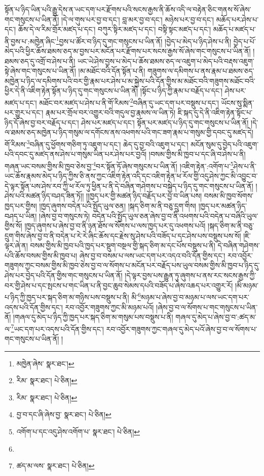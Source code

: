 སྟོན་པ་ཉིད་ཡིན་པའི་རྒྱུ་དེས་ན་ཡང་དག་པར་རྫོགས་པའི་སངས་རྒྱས་ནི་ཆོས་འདི་ལ་བརྟེན་ཅིང་གནས་སོ་ཞེས་གང་གསུངས་པ་ཡིན་ནོ། །དེ་ལ་གུས་པར་བྱ་བ་དང་། བླ་མར་བྱ་བ་དང་། མཉེས་པར་བྱ་བ་དང་། མཆོད་པར་ཤེས་པ་དང་། ཆོས་དེ་ལ་རིམ་གྲོར་མཛད་པ་དང་། བཀུར་སྟིར་མཛད་པ་དང་། བསྟི་སྟང་མཛད་པ་དང་། མཆོད་པ་མཛད་པ་ནི་བྱས་པ་:མཁྱེན་ཞིང་\footnote{མཁྱེན་ཞེས་  སྣར་ཐང་། }བྱས་པ་ཚོར་བ་ཉིད་དུ་གང་གསུངས་པ་ཡིན་ནོ། །བྱེད་པ་མེད་པ་ཉིད་ཤེས་པ་ནི། བྱེད་པ་པོ་མེད་པའི་ཕྱིར་ཆོས་ཐམས་ཅད་མ་བྱས་པར་མངོན་པར་རྫོགས་པར་སངས་རྒྱས་སོ་ཞེས་གང་གསུངས་པ་ཡིན་ནོ། །ཐམས་ཅད་དུ་འགྲོ་བ་ཤེས་པ་ནི། ཡང་ཡེ་ཤེས་བྱས་པ་མེད་པ་ཆོས་ཐམས་ཅད་ལ་འཇུག་པ་མེད་པའི་བརྡས་འཇུག་སྟེ་ཞེས་གང་གསུངས་པ་ཡིན་ནོ། །མ་མཐོང་བའི་དོན་སྟོན་པ་ནི། གཟུགས་ལ་དམིགས་པ་ནས་རྣམ་པ་ཐམས་ཅད་མཁྱེན་པ་ཉིད་ལ་དམིགས་པའི་བར་གྱི་རྣམ་པར་ཤེས་པ་མ་སྐྱེས་པའི་དོན་གྱིས་མ་མཐོང་བའི་གཟུགས་མཐོང་བའི་ཕྱིར་དེ་ནི་འཇིག་རྟེན་སྟོན་པ་ཉིད་དུ་གང་གསུངས་པ་ཡིན་ནོ། །སྟོང་པ་ཉིད་ཀྱི་རྣམ་པ་བརྗོད་པ་དང་། ཤེས་པར་མཛད་པ་དང་། མཐོང་བར་མཛད་པ་ཤེས་པ་ནི་གོ་རིམས་\footnote{རིམ་  སྣར་ཐང་།  པེ་ཅིན། }བཞིན་དུ་ཡང་དག་པར་བསྡུས་པ་དང་། ཡོངས་སུ་སྨིན་པར་གྱུར་པ་དང་། རྣམ་པར་གྲོལ་བར་འགྱུར་བའི་གདུལ་བྱ་རྣམས་ལ་ཡིན་ཏེ། ཇི་སྐད་དུ་དེ་ནི་འཇིག་རྟེན་སྟོང་པ་ཉིད་དོ་ཞེས་བྱ་བར་བརྗོད་པ་དང་། ཤེས་པར་མཛད་པ་དང་། སྟོན་པར་མཛད་པ་ཉིད་དུ་གང་གསུངས་པ་ཡིན་ནོ། །དེ་ལ་ཐམས་ཅད་མཁྱེན་པ་ཉིད་གསུམ་ལ་དགོངས་ནས་འཕགས་པའི་གང་ཟག་རྣམ་པ་གསུམ་གྱི་དབང་དུ་མཛད་དེ། གོ་རིམས་\footnote{རིམ་  སྣར་ཐང་།  པེ་ཅིན། }བཞིན་དུ་ཕྱོགས་གཅིག་ཏུ་འཇུག་པ་དང་། ཆེད་དུ་བྱ་བའི་འཇུག་པ་དང་། མངོན་སུམ་དུ་བྱེད་པའི་འཇུག་པའི་དབང་དུ་མཛད་ནས་ཤེས་པ་གསུམ་ཡིན་པར་ཤེས་པར་བྱའོ། །བསམ་གྱིས་མི་ཁྱབ་པ་དང་ཞི་བ་ཤེས་པ་ནི། གཞན་ཡང་བསམ་གྱིས་མི་ཁྱབ་ཅེས་བྱ་\footnote{བྱ་བ་དང་ཞི་ཞེས་བྱ་  སྣར་ཐང་།  པེ་ཅིན། }བར་སྟོན་ཏོ་ཞེས་གསུངས་པ་ཡིན་ནོ། །འཇིག་རྟེན་:འགོག་པ་\footnote{འགོག་པ་དང་འདུ་ཤེས་འགོག་པ་  སྣར་ཐང་།  པེ་ཅིན། }ཤེས་པ་ནི་ཡང་ཆོས་རྣམས་མེད་པ་ཉིད་ཀྱིས་ཅི་ནས་ཀྱང་འཇིག་རྟེན་འདི་དང་འཇིག་རྟེན་ཕ་རོལ་གྱི་འདུ་ཤེས་ཀྱང་མི་འབྱུང་བ་དེ་ལྟར་སྟོན་པས་ཤེས་རབ་ཀྱི་ཕ་རོལ་ཏུ་ཕྱིན་པ་ནི་དེ་བཞིན་གཤེགས་པ་བསྐྱེད་པ་ཉིད་དུ་གང་གསུངས་པ་ཡིན་ནོ། །ཤེས་པའི་མཚན་ཉིད་བཤད་ཟིན་ཏོ།། །།ཁྱད་པར་གྱི་མཚན་ཉིད་བརྗོད་པར་བྱ་བ་ཡིན་པས། བསམ་མི་ཁྱབ་སོགས་ཁྱད་པར་གྱིས། །ཁྱད་ཞུགས་བདེན་པའི་སྤྱོད་ཡུལ་ཅན། །སྐད་ཅིག་མ་ནི་བཅུ་དྲུག་གིས། །ཁྱད་པར་མཚན་ཉིད་བཤད་པ་ཡིན། །ཞེས་བྱ་བ་གསུངས་ཏེ། བདེན་པའི་སྤྱོད་ཡུལ་ཅན་ཞེས་བྱ་བ་ནི་འཕགས་པའི་བདེན་པ་བཞིའི་ཡུལ་གྱིས་སོ། །ཁྱད་ཞུགས་པ་ཞེས་བྱ་བ་ནི་ཉན་ཐོས་ལ་སོགས་པ་ལས་ཁྱད་པར་དུ་འཕགས་པའོ། །སྐད་ཅིག་མ་ནི་བཅུ་དྲུག་གིས་ཞེས་བྱ་བ་ནི་བདེན་པ་རེ་རེ་ཞིང་ཆོས་དང་རྗེས་སུ་ཤེས་པའི་བཟོད་པ་དང་ཤེས་པས་བསྡུས་པས་སོ། །ཇི་ལྟར་ཞེ་ན། བསམ་གྱིས་མི་ཁྱབ་པའི་ཁྱད་པར་སྡུག་བསྔལ་གྱི་སྐད་ཅིག་མ་དང་པོས་བསྡུས་པ་ནི། དེ་བཞིན་གཤེགས་པའི་ཆོས་བསམ་གྱིས་མི་ཁྱབ་པ། ཞེས་བྱ་བ་བསམ་པ་ལས་ཡང་དག་པར་འདའ་བའི་དོན་གྱིས་དང་། རབ་འབྱོར་གཟུགས་ཀྱང་བསམ་གྱིས་མི་ཁྱབ་ཅེས་བྱ་བ་ལ་སོགས་པ་མངོན་པར་བརྗོད་པས་ཡུལ་བསམ་གྱིས་མི་ཁྱབ་པ་ཉིད་དུ་ཤེས་པར་བྱེད་པའི་དོན་གྱིས་གང་གསུངས་པ་ཡིན་ནོ། །དེ་ལྟར་བྱས་པས་རྒྱུན་ཏུ་ཞུགས་པ་ནས་རང་སངས་རྒྱས་ཀྱི་བར་གྱི་ཤེས་པ་དང་སྤངས་པ་གང་ཡིན་པ་ནི་བྱང་ཆུབ་སེམས་དཔའི་བཟོད་པ་ཞེས་འཆད་པར་འགྱུར་རོ། །མི་མཉམ་པ་ཉིད་ཀྱི་ཁྱད་པར་སྐད་ཅིག་མ་གཉིས་པས་བསྡུས་པ་ནི། མི་\footnote{}མཉམ་པ་ཞེས་བྱ་བ་མཉམ་པ་ལས་ཡང་དག་པར་འདས་པའི་དོན་གྱིས་དང་། རབ་འབྱོར་གཟུགས་ཀྱང་མི་མཉམ་པའོ། །ཞེས་བྱ་བ་ལ་སོགས་པ་གང་གསུངས་པ་ཡིན་ནོ། །གཞལ་དུ་མེད་པ་ཉིད་ཀྱི་ཁྱད་པར་སྐད་ཅིག་མ་གསུམ་པས་བསྡུས་པ་ནི། གཞལ་དུ་མེད་པ་ཞེས་བྱ་བ་:ཚད་མ་ལ་\footnote{ཚད་མ་ལས་  སྣར་ཐང་།  པེ་ཅིན། }ཡང་དག་པར་འདས་པའི་དོན་གྱིས་དང་། རབ་འབྱོར་གཟུགས་ཀྱང་གཞལ་དུ་མེད་པའོ་ཞེས་བྱ་བ་ལ་སོགས་པ་གང་གསུངས་པ་ཡིན་ནོ། །
